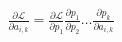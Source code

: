 \documentclass[preview]{standalone}
\begin{document}
\begin{align*}
\frac{\partial \mathcal{L}}{\partial a_{i,k}} = \frac{\partial \mathcal{L}}{\partial p_1}\frac{\partial p_1}{\partial p_2} \ldots \frac{\partial p_k}{\partial a_{i,k}}
\end{align*}
\end{document}
